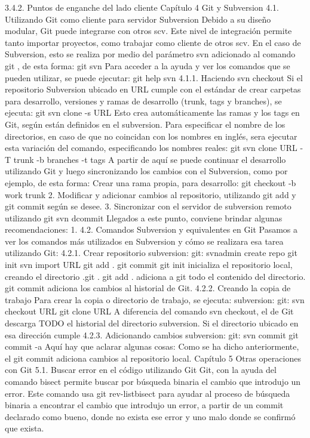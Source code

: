 \documentclass[12pt, spanish, oneside, onecolumn, a4paper]{report}
\begin{document}
3.4.2. Puntos de enganche del lado cliente
 Capítulo 4
Git y Subversion
4.1. Utilizando Git como cliente para servidor Subversion
Debido a su diseño modular, Git puede integrarse con otros \gls{scv}. Este nivel de integración permite tanto importar proyectos, como trabajar como cliente de otros \gls{scv}. En el caso de Subversion, esto se realiza por medio del parámetro svn adicionado al comando git , de esta forma:
 git svn
Para acceder a la ayuda y ver los comandos que se pueden utilizar, se puede ejecutar:
 git help svn
4.1.1. Haciendo svn checkout
Si el repositorio Subversion ubicado en URL cumple con el estándar de crear carpetas para desarrollo, versiones y ramas de desarrollo (trunk, tags y branches), se ejecuta:
 git svn clone -s URL
Esto crea automáticamente las ramas y los tags en Git, según están definidos en el subversion. Para especificar el nombre de los directorios, en caso de que no coincidan con los nombres en inglés, sera ejecutar esta variación del comando, especificando los nombres reales:
 git svn clone URL -T trunk -b branches -t tags
A partir de aquí se puede continuar el desarrollo utilizando Git y luego sincronizando los cambios con el Subversion, como por ejemplo, de esta forma:
Crear una rama propia, para desarrollo:
 git checkout -b work trunk
2. Modificar y adicionar cambios al repositorio, utilizando git add y git commit según se desee.
3. Sincronizar con el servidor de subversion remoto utilizando
 git svn dcommit
Llegados a este punto, conviene brindar algunas recomendaciones:
1.
4.2. Comandos Subversion y equivalentes en Git
Pasamos a ver los comandos más utilizados en Subversion y cómo se realizara esa tarea utilizando Git:
4.2.1. Crear repositorio
subversion: git:  svnadmin create repo  git init  svn import URL  git add .  git commit git init inicializa el repositorio local, creando el directorio .git .
git add . adiciona a git todo el contenido del directorio.
git commit adiciona los cambios al historial de Git.
4.2.2. Creando la copia de trabajo
Para crear la copia o directorio de trabajo, se ejecuta: subversion: git:  svn checkout URL  git clone URL A diferencia del comando svn checkout, el de Git descarga TODO el historial del directorio subversion. Si el directorio ubicado en esa dirección cumple
 4.2.3. Adicionando cambios
subversion: git:  svn commit  git commit -a Aquí hay que aclarar algunas cosas:
Como se ha dicho anteriormente, el git commit adiciona cambios al repositorio local.
 Capítulo 5
Otras operaciones con Git
5.1. Buscar error en el código utilizando Git
Git, con la ayuda del comando  bisect  permite buscar por búsqueda binaria el cambio que introdujo un error. Este comando usa git rev-listbisect para ayudar al proceso de búsqueda binaria a encontrar el cambio que introdujo un error, a partir de un commit declarado como bueno, donde no exista ese error y uno malo donde se confirmó que exista.
\end{document}
